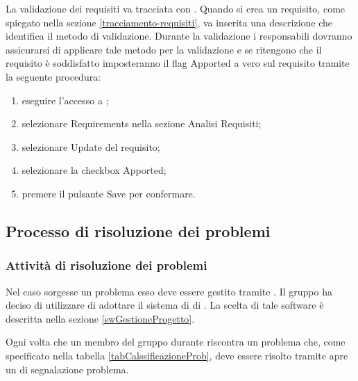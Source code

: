 \documentclass[12pt,a4paper]{article}
\begin{document}
La validazione dei requisiti va tracciata con . Quando si crea un requisito, come spiegato nella sezione \ref{tracciamento-requisiti}, va inserita una descrizione che identifica il metodo di validazione. Durante la validazione i responsabili dovranno assicurarsi di applicare tale metodo per la validazione e se ritengono che il requisito è soddisfatto imposteranno il flag Apported a vero sul requisito tramite la seguente procedura:
\begin{enumerate}
	\item eseguire l'accesso a ;
	\item selezionare Requirements nella sezione Analisi Requisiti;
	\item selezionare Update del requisito;
	\item selezionare la checkbox Apported;
	\item premere il pulsante Save per confermare.
\end{enumerate}


\subsection{Processo di risoluzione dei problemi}

\subsubsection{Attività di risoluzione dei problemi} \label{gestioneDeiProblemi}
Nel caso sorgesse un problema esso deve essere gestito tramite . Il gruppo ha deciso di utilizzare  di adottare il sistema di  di . La scelta di tale software è descritta nella sezione \ref{swGestioneProgetto}.

Ogni volta che un membro del gruppo durante riscontra un problema che, come specificato nella tabella \ref{tabCalssificazioneProb}, deve essere risolto tramite  apre un  di segnalazione problema.
\end{document}
